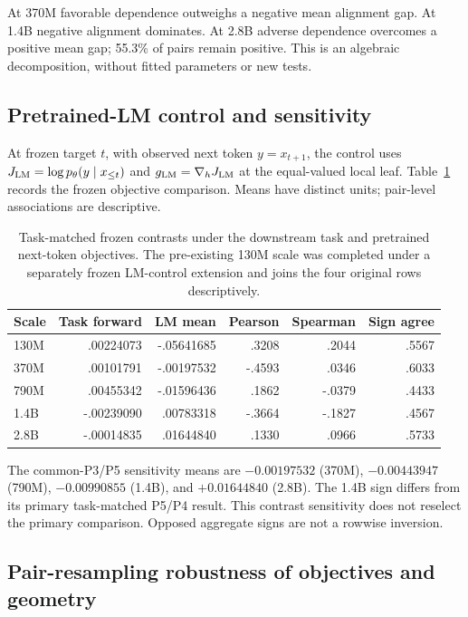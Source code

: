 At 370M favorable dependence outweighs a negative mean alignment gap.
At 1.4B negative alignment dominates. At 2.8B adverse dependence
overcomes a positive mean gap; 55.3\% of pairs remain positive.
This is an algebraic decomposition, without fitted parameters or new tests.

\subsection{Pretrained-LM control and sensitivity}
\label{app:vanilla}

At frozen target $t$, with observed next token $y=x_{t+1}$, the control
uses $J_{\rm LM}=\log p_\theta(y\mid x_{\leq t})$ and
$g_{\rm LM}=\nabla_h J_{\rm LM}$ at the equal-valued local leaf.
Table~\ref{tab:vanilla} records the frozen objective comparison. Means
have distinct units; pair-level associations are descriptive.

\begin{table}[h]
\centering\small
\caption{Task-matched frozen contrasts under the downstream task and pretrained
next-token objectives. The pre-existing 130M scale was completed under a
separately frozen LM-control extension and joins the four original rows
descriptively.}
\label{tab:vanilla}
\begin{tabular}{lrrrrr}
\toprule
Scale & Task forward & LM mean & Pearson & Spearman & Sign agree \\
\midrule
130M & .00224073 & -.05641685 & .3208 & .2044 & .5567 \\
370M & .00101791 & -.00197532 & -.4593 & .0346 & .6033 \\
790M & .00455342 & -.01596436 & .1862 & -.0379 & .4433 \\
1.4B & -.00239090 & .00783318 & -.3664 & -.1827 & .4567 \\
2.8B & -.00014835 & .01644840 & .1330 & .0966 & .5733 \\
\bottomrule
\end{tabular}
\end{table}

The common-P3/P5 sensitivity means are $-0.00197532$ (370M),
$-0.00443947$ (790M), $-0.00990855$ (1.4B), and
$+0.01644840$ (2.8B).
The 1.4B sign differs from its primary task-matched P5/P4 result.
This contrast sensitivity does not reselect the primary comparison.
Opposed aggregate signs are not a rowwise inversion.

\subsection{Pair-resampling robustness of objectives and geometry}
\label{app:robustness}

